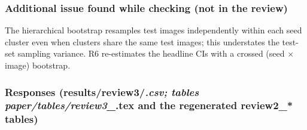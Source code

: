 {\subsubsection{Additional issue found while checking (not in the review)}\label{additional-issue-found-while-checking-not-in-the-review}

The hierarchical bootstrap resamples test images independently within each seed cluster even when clusters share the
same test images; this understates the test-set sampling variance. R6 re-estimates the headline CIs with a crossed
(seed × image) bootstrap.

\subsubsection{\texorpdfstring{Responses (results/review3/\emph{.csv; tables paper/tables/review3\_}.tex and the regenerated review2\_* tables)}{Responses (results/review3/.csv; tables paper/tables/review3\_.tex and the regenerated review2\_* tables)}}\label{responses-resultsreview3csv-tables-papertablesreview3_tex-and-the-regenerated-review2_-tables}

\begin{enumerate}
\def\labelenumi{\arabic{enumi}.}


\end{enumerate}}
